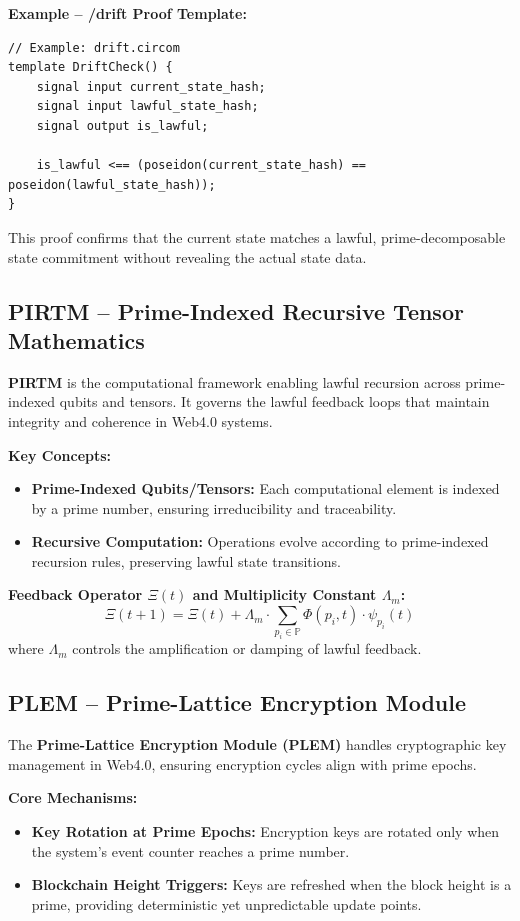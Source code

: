 \documentclass[12]{amsart}
\theoremstyle{plain}
\begin{document}
\textbf{Example -- /drift Proof Template:}
\begin{verbatim}
// Example: drift.circom
template DriftCheck() {
    signal input current_state_hash;
    signal input lawful_state_hash;
    signal output is_lawful;

    is_lawful <== (poseidon(current_state_hash) == poseidon(lawful_state_hash));
}
\end{verbatim}
This proof confirms that the current state matches a lawful, prime-decomposable state commitment without revealing the actual state data.

\subsection{PIRTM -- Prime-Indexed Recursive Tensor Mathematics}
\textbf{PIRTM} is the computational framework enabling lawful recursion across prime-indexed qubits and tensors. It governs the lawful feedback loops that maintain integrity and coherence in Web4.0 systems.

\textbf{Key Concepts:}
\begin{itemize}
    \item \textbf{Prime-Indexed Qubits/Tensors:} Each computational element is indexed by a prime number, ensuring irreducibility and traceability.
    \item \textbf{Recursive Computation:} Operations evolve according to prime-indexed recursion rules, preserving lawful state transitions.
\end{itemize}

\textbf{Feedback Operator $\Xi(t)$ and Multiplicity Constant $\Lambda_m$:}
\begin{equation}
\Xi(t+1) = \Xi(t) + \Lambda_m \cdot \sum_{p_i \in \mathbb{P}} \Phi(p_i, t) \cdot \psi_{p_i}(t)
\end{equation}
where $\Lambda_m$ controls the amplification or damping of lawful feedback.

\subsection{PLEM -- Prime-Lattice Encryption Module}
The \textbf{Prime-Lattice Encryption Module (PLEM)} handles cryptographic key management in Web4.0, ensuring encryption cycles align with prime epochs.

\textbf{Core Mechanisms:}
\begin{itemize}
    \item \textbf{Key Rotation at Prime Epochs:} Encryption keys are rotated only when the system’s event counter reaches a prime number.
    \item \textbf{Blockchain Height Triggers:} Keys are refreshed when the block height is a prime, providing deterministic yet unpredictable update points.
\end{itemize}
\end{document}
